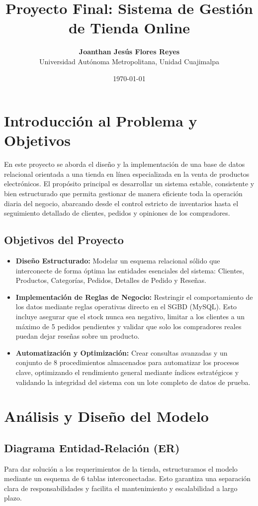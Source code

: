\documentclass[11pt,a4paper]{article}
\title{\textbf{Proyecto Final: Sistema de Gestión de Tienda Online}}
\author{\textbf{Joanthan Jesús Flores Reyes} \\ Universidad Autónoma Metropolitana, Unidad Cuajimalpa}
\date{\today}
\begin{document}
\maketitle
\tableofcontents
\newpage

\section{Introducción al Problema y Objetivos}
En este proyecto se aborda el diseño y la implementación de una base de datos relacional orientada a una tienda en línea especializada en la venta de productos electrónicos. El propósito principal es desarrollar un sistema estable, consistente y bien estructurado que permita gestionar de manera eficiente toda la operación diaria del negocio, abarcando desde el control estricto de inventarios hasta el seguimiento detallado de clientes, pedidos y opiniones de los compradores.

\subsection{Objetivos del Proyecto}
\begin{itemize}[label=$\bullet$]
    \item \textbf{Diseño Estructurado:} Modelar un esquema relacional sólido que interconecte de forma óptima las entidades esenciales del sistema: Clientes, Productos, Categorías, Pedidos, Detalles de Pedido y Reseñas.
    \item \textbf{Implementación de Reglas de Negocio:} Restringir el comportamiento de los datos mediante reglas operativas directo en el SGBD (MySQL). Esto incluye asegurar que el stock nunca sea negativo, limitar a los clientes a un máximo de 5 pedidos pendientes y validar que solo los compradores reales puedan dejar reseñas sobre un producto.
    \item \textbf{Automatización y Optimización:} Crear consultas avanzadas y un conjunto de 8 procedimientos almacenados para automatizar los procesos clave, optimizando el rendimiento general mediante índices estratégicos y validando la integridad del sistema con un lote completo de datos de prueba.
\end{itemize}

\section{Análisis y Diseño del Modelo}

\subsection{Diagrama Entidad-Relación (ER)}
Para dar solución a los requerimientos de la tienda, estructuramos el modelo mediante un esquema de 6 tablas interconectadas. Esto garantiza una separación clara de responsabilidades y facilita el mantenimiento y escalabilidad a largo plazo.
\end{document}

